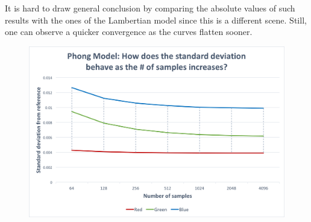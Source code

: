 \documentclass{article}
\begin{document}
It is hard to draw general conclusion by comparing the absolute values of such results with the ones of the Lambertian model since this is a different scene. Still, one can observe a quicker convergence as the curves flatten sooner.
\begin{figure}[h]
\centering
\includegraphics[width=\textwidth]{assets/phong_stdev}
\label{fig:phong_stdev}
\end{figure}
\end{document}

